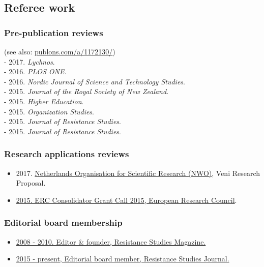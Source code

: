 \documentclass[a4paper,11pt,oneside]{article}
\begin{document}
{%


\subsection{Referee work}

    \subsubsection{Pre-publication reviews}
    (see also: \href{publons.com/a/1172130/}{publons.com/a/1172130/})\\
    - 2017. \emph{Lychnos}.\\
    - 2016. \emph{PLOS ONE}. \\
    - 2016. \emph{Nordic Journal of Science and Technology Studies}.\\
    - 2015. \emph{Journal of the Royal Society of New Zealand}. \\
    - 2015. \emph{Higher Education}.\\
    - 2015. \emph{Organization Studies}.\\
    - 2015. \emph{Journal of Resistance Studies}.\\
    - 2015. \emph{Journal of Resistance Studies}. \\

    \subsubsection{Research applications reviews}
    \begin{itemize}
      \item 2017. \href{http://nwo.nl}{Netherlands Organisation for Scientific Research (NWO)}, Veni Research Proposal.
      \item \href{http://files.christopherkullenberg.se/erc.pdf}{2015. ERC Consolidator Grant Call 2015, European Research Council}.
    \end{itemize}

    \subsubsection{Editorial board membership}
    \begin{itemize}
      \item \href{http://resistance-journal.org/the-old-rs-mag/}{2008 - 2010. Editor \& founder, Resistance Studies Magazine.}
      \item \href{http://resistance-journal.org/editorialboard/}{2015 - present, Editorial board member, Resistance Studies Journal.}
    \end{itemize}


}
\end{document}
